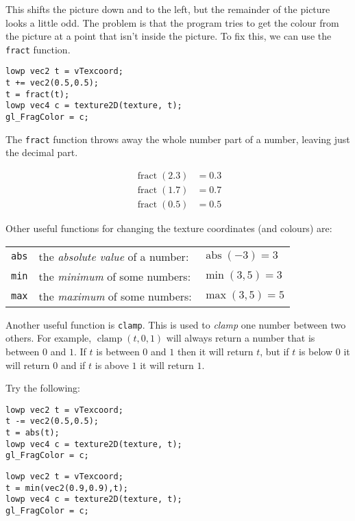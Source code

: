 \documentclass[
  html5,%
  mathml,%
  use filename%
]{internet}
\DeclareMathOperator\fract{fract}
\DeclareMathOperator\clamp{clamp}
\DeclareMathOperator\abs{abs}
\begin{document}
This shifts the picture down and to the left, but the remainder of the picture looks a little odd.
The problem is that the program tries to get the colour from the picture at a point that isn't inside the picture.
To fix this, we can use the \verb!fract! function.

\begin{tcolorbox}
\begin{verbatim}
lowp vec2 t = vTexcoord;
t += vec2(0.5,0.5);
t = fract(t);
lowp vec4 c = texture2D(texture, t);
gl_FragColor = c;
\end{verbatim}
\end{tcolorbox}

The \verb!fract! function throws away the whole number part of a number, leaving just the decimal part.

\begin{align*}
\fract(2.3) &= 0.3 \\
\fract(1.7) &= 0.7 \\
\fract(0.5) &= 0.5
\end{align*}

Other useful functions for changing the texture coordinates (and colours) are:

\begin{tabular}{rll}
\verb!abs! & the \emph{absolute value} of a number: & \(\abs(-3) = 3\) \\
\verb!min! & the \emph{minimum} of some numbers: & \(\min(3,5) = 3\) \\
\verb!max! & the \emph{maximum} of some numbers: & \(\max(3,5) = 5\)
\end{tabular}

Another useful function is \verb!clamp!.
This is used to \emph{clamp} one number between two others.
For example, \(\clamp(t,0,1)\) will always return a number that is between \(0\) and \(1\).
If \(t\) is between \(0\) and \(1\) then it will return \(t\), but if \(t\) is below \(0\) it will return \(0\) and if \(t\) is above \(1\) it will return \(1\).

Try the following:

\begin{tcolorbox}
\begin{verbatim}
lowp vec2 t = vTexcoord;
t -= vec2(0.5,0.5);
t = abs(t);
lowp vec4 c = texture2D(texture, t);
gl_FragColor = c;
\end{verbatim}
\end{tcolorbox}

\begin{tcolorbox}
\begin{verbatim}
lowp vec2 t = vTexcoord;
t = min(vec2(0.9,0.9),t);
lowp vec4 c = texture2D(texture, t);
gl_FragColor = c;
\end{verbatim}
\end{tcolorbox}
\end{document}
